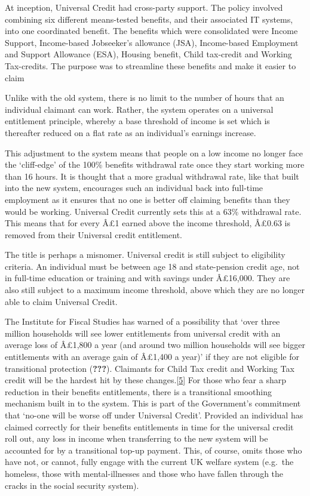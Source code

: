 \documentclass[]{tufte-handout}
\begin{document}
At inception, Universal Credit had cross-party support. The policy
involved combining six different means-tested benefits, and their
associated IT systems, into one coordinated benefit. The benefits which
were consolidated were Income Support, Income-based Jobseeker's
allowance (JSA), Income-based Employment and Support Allowance (ESA),
Housing benefit, Child tax-credit and Working Tax-credits. The purpose
was to streamline these benefits and make it easier to claim

Unlike with the old system, there is no limit to the number of hours
that an individual claimant can work. Rather, the system operates on a
universal entitlement principle, whereby a base threshold of income is
set which is thereafter reduced on a flat rate as an individual's
earnings increase.

This adjustment to the system means that people on a low income no
longer face the `cliff-edge' of the 100\% benefits withdrawal rate once
they start working more than 16 hours. It is thought that a more gradual
withdrawal rate, like that built into the new system, encourages such an
individual back into full-time employment as it ensures that no one is
better off claiming benefits than they would be working. Universal
Credit currently sets this at a 63\% withdrawal rate. This means that
for every Â£1 earned above the income threshold, Â£0.63 is removed from
their Universal credit entitlement.

The title is perhaps a misnomer. Universal credit is still subject to
eligibility criteria. An individual must be between age 18 and
state-pension credit age, not in full-time education or training and
with savings under Â£16,000. They are also still subject to a maximum
income threshold, above which they are no longer able to claim Universal
Credit.

The Institute for Fiscal Studies has warned of a possibility that `over
three million households will see lower entitlements from universal
credit with an average loss of Â£1,800 a year (and around two million
households will see bigger entitlements with an average gain of Â£1,400
a year)' if they are not eligible for transitional protection
({\textbf{???}}). Claimants for Child Tax credit and Working Tax credit
will be the hardest hit by these
changes.{[}\protect\hyperlink{_ftn5}{5{]}} For those who fear a sharp
reduction in their benefits entitlements, there is a transitional
smoothing mechanism built in to the system. This is part of the
Government's commitment that `no-one will be worse off under Universal
Credit'. Provided an individual has claimed correctly for their benefits
entitlements in time for the universal credit roll out, any loss in
income when transferring to the new system will be accounted for by a
transitional top-up payment. This, of course, omits those who have not,
or cannot, fully engage with the current UK welfare system (e.g.~the
homeless, those with mental-illnesses and those who have fallen through
the cracks in the social security system).
\end{document}
